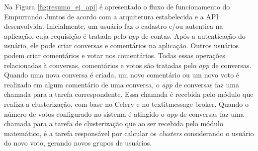 Na Figura \ref{fig:resumo_ej_api} é apresentado o fluxo de funcionamento do Empurrando Juntos de acordo com a arquitetura
estabelecida e a API desenvolvida. Inicialmente, um usuário faz o cadastro e/ou autentica na aplicação, cuja requisição é tratada pelo \textit{app} de contas.
Após a autenticação do usuário, ele pode criar conversas e comentários na aplicação. Outros usuários podem criar comentários e votar
nos comentários. Todas essas operações relacionadas à conversas, comentários e votos são tratadas pelo \textit{app} de conversas.
Quando uma nova conversa é criada, um novo comentário ou um novo voto é realizado em algum comentário de uma conversa, o 
\textit{app} de conversas faz uma chamada para a tarefa correspondente. Essa chamada é recebida pelo módulo que realiza a clusterização, 
com base no Celery e no textit{message broker}. Quando o número de votos configurado no sistema é atingido o \textit{app} de conversas
faz uma chamada para a tarefa de clusterização que ao ser recebida pelo módulo matemático, é a tarefa responsável por calcular
os \textit{clusters} considerando o usuário do novo voto, gerando novos grupos de usuários.